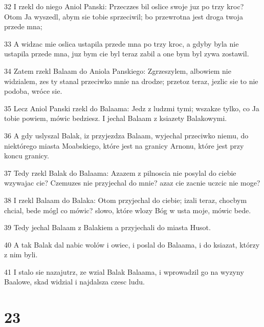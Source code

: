 \par 32 I rzekl do niego Aniol Panski: Przeczzes bil oslice swoje juz po trzy kroc? Otom Ja wyszedl, abym sie tobie sprzeciwil; bo przewrotna jest droga twoja przede mna;
\par 33 A widzac mie oslica ustapila przede mna po trzy kroc, a gdyby byla nie ustapila przede mna, juz bym cie byl teraz zabil a one bym byl zywa zostawil.
\par 34 Zatem rzekl Balaam do Aniola Panskiego: Zgrzeszylem, albowiem nie widzialem, zes ty stanal przeciwko mnie na drodze; przetoz teraz, jezlic sie to nie podoba, wróce sie.
\par 35 Lecz Aniol Panski rzekl do Balaama: Jedz z ludzmi tymi; wszakze tylko, co Ja tobie powiem, mówic bedziesz. I jechal Balaam z ksiazety Balakowymi.
\par 36 A gdy uslyszal Balak, iz przyjezdza Balaam, wyjechal przeciwko niemu, do niektórego miasta Moabskiego, które jest na granicy Arnonu, które jest przy koncu granicy.
\par 37 Tedy rzekl Balak do Balaama: Azazem z pilnoscia nie posylal do ciebie wzywajac cie? Czemuzes nie przyjechal do mnie? azaz cie zacnie uczcic nie moge?
\par 38 I rzekl Balaam do Balaka: Otom przyjechal do ciebie; izali teraz, chocbym chcial, bede mógl co mówic? slowo, które wlozy Bóg w usta moje, mówic bede.
\par 39 Tedy jechal Balaam z Balakiem a przyjechali do miasta Husot.
\par 40 A tak Balak dal nabic wolów i owiec, i poslal do Balaama, i do ksiazat, którzy z nim byli.
\par 41 I stalo sie nazajutrz, ze wzial Balak Balaama, i wprowadzil go na wyzyny Baalowe, skad widzial i najdalsza czesc ludu.

\chapter{23}


